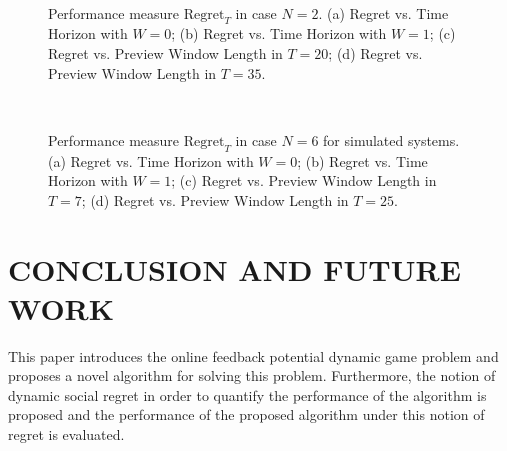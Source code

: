 \documentclass[letterpaper, 10 pt, conference]{ieeeconf}  %
\begin{document}
\begin{figure}
        \label{fig:experiments}
     \centering
    \\
    \caption{Performance measure $\text{Regret}_{T}$ in case $N=2$. (a) Regret vs. Time Horizon with $W=0$;  (b) Regret vs. Time Horizon with $W=1$; (c) Regret vs. Preview Window Length in $T=20$; (d) Regret vs. Preview Window Length in $T = 35$.}
\end{figure}

\begin{figure}
        \label{fig:experiments2}
     \centering
    \\
    \caption{Performance measure $\text{Regret}_{T}$ in case $N=6$ for simulated systems. (a) Regret vs. Time Horizon with $W=0$; (b) Regret vs. Time Horizon with $W=1$; (c) Regret vs. Preview Window Length in $T=7$; (d) Regret vs. Preview Window Length in $T = 25$.}
\end{figure}

\section{CONCLUSION AND FUTURE WORK}\label{sec:conclusions}
This paper introduces the online feedback potential dynamic game problem and proposes a novel algorithm for solving this problem. Furthermore, the notion of  dynamic social regret in order to quantify the performance of the algorithm is proposed and the performance of the proposed algorithm under this notion of regret is evaluated. 
\end{document}
